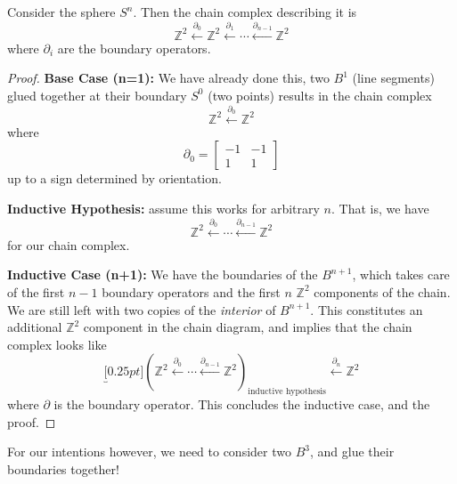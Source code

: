 \begin{thm}%
Consider the sphere $S^{n}$. Then the chain complex describing it
is
\begin{equation}%
\mathbb{Z}^{2} \xleftarrow{\partial_{0}}\mathbb{Z}^{2}\xleftarrow{\partial_{1}}\cdots\xleftarrow{\partial_{n-1}}\mathbb{Z}^{2}
\end{equation}
where $\partial_{i}$ are the boundary operators.
\end{thm}
\begin{proof}
\noindent\textbf{Base Case (n=1):} We have already done this, two $B^{1}$
(line segments) glued together at their boundary $S^{0}$ (two
points) results in the chain complex
\begin{equation}%
\mathbb{Z}^{2}\xleftarrow{\partial_{0}}\mathbb{Z}^{2}
\end{equation}
where
\begin{equation}%
\partial_{0} = \begin{bmatrix}-1 & -1\\1 & 1\end{bmatrix}
\end{equation}
up to a sign determined by orientation.

\noindent\textbf{Inductive Hypothesis:} assume this works for arbitrary
$n$. That is, we have
\begin{equation}%
\mathbb{Z}^{2}\xleftarrow{\partial_{0}}\cdots\xleftarrow{\partial_{n-1}}\mathbb{Z}^{2}
\end{equation}
for our chain complex.

\noindent\textbf{Inductive Case (n+1):} We have the boundaries of the
$B^{n+1}$, which takes care of the first $n-1$ boundary operators
and the first $n$ $\mathbb{Z}^{2}$ components of the chain. We
are still left with two copies of the \emph{interior} of
$B^{n+1}$. This constitutes an additional $\mathbb{Z}^{2}$
component in the chain diagram, and implies that the chain
complex looks like
\begin{equation}%
\underbracket[0.25pt]{\left(\mathbb{Z}^{2}\xleftarrow{\partial_{0}}\cdots\xleftarrow{\partial_{n-1}}\mathbb{Z}^{2}\right)}_{\text{inductive hypothesis}}\xleftarrow{\partial_{n}}\mathbb{Z}^{2}
\end{equation}
where $\partial$ is the boundary operator. This concludes the
inductive case, and the proof.
\end{proof}
For our intentions however, we need to consider
two $B^{3}$, and glue their boundaries together!
